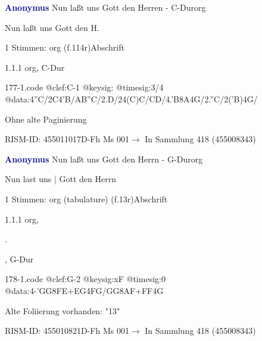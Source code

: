 \documentclass[twocolumn, 12pt]{book}
\begin{document}
\par \vspace{16pt} \textcolor{darkblue}{\textbf{Anonymus  }}\hfillplus{\textbf{[177]}}\newline Nun laßt uns Gott den Herren - C-Dur\newline org
\par \begin{itshape}[f.114r, heading:] Nun laßt uns Gott den H.\end{itshape} 
\par \textcolor{darkblue}{}  1 Stimmen: org  (f.114r)\newline Abschrift
\par 1.1.1  org, C-Dur  
\begin{filecontents*}{177-1.code}
@clef:C-1
@keysig:
@timesig:3/4
@data:4''C/2C4'B/AB''C/2.D/24(C)C/CD/4.'B8A4G/2.''C/2('B)4G/
\end{filecontents*}
\newline %
\par Ohne alte Paginierung
\par RISM-ID: 455011017\newline D-Fh  Ms 001\newline $\rightarrow$ In Sammlung 418 (455008343)
      
\par \vspace{16pt} \textcolor{darkblue}{\textbf{Anonymus  }}\hfillplus{\textbf{[178]}}\newline Nun laßt uns Gott den Herrn - G-Dur\newline org
\par \begin{itshape}[f.13r, at left:] Nun last uns | Gott den Herrn\end{itshape} 
\par \textcolor{darkblue}{}  1 Stimmen: org (tabulature)  (f.13r)\newline Abschrift
\par 1.1.1  org, \begin{itshape}.\end{itshape}, G-Dur  
\begin{filecontents*}{178-1.code}
@clef:G-2
@keysig:xF
@timesig:0
@data:4-'GG{8FE+}{EG}4FG/GG{8AF+}{FF}4G
\end{filecontents*}
\newline %
\par Alte Foliierung vorhanden: "13"
\par RISM-ID: 455010821\newline D-Fh  Ms 001\newline $\rightarrow$ In Sammlung 418 (455008343)
      
\end{document}
